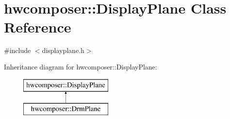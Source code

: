 \hypertarget{classhwcomposer_1_1DisplayPlane}{}\section{hwcomposer\+:\+:Display\+Plane Class Reference}
\label{classhwcomposer_1_1DisplayPlane}


{\ttfamily \#include $<$displayplane.\+h$>$}

Inheritance diagram for hwcomposer\+:\+:Display\+Plane\+:\begin{figure}[H]
\begin{center}
\leavevmode
\includegraphics[height=2.000000cm]{classhwcomposer_1_1DisplayPlane}
\end{center}
\end{figure}
